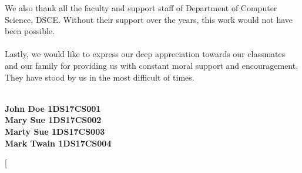 \documentclass[ 12pt,a4paper,twocolumn,fleqn]{article}
\begin{document}
We also thank all the faculty and support staff of Department of Computer Science, DSCE. Without their support over the years, this work would not have been possible.
\\
\hfill
\\
Lastly, we would like to express our deep appreciation towards our classmates and our family for providing us with constant moral support and encouragement. They have stood by us in the most difficult of times.
\\
\hfill
\\
\begin{flushright}
\textbf{John Doe \space 1DS17CS001} \\
\textbf{Mary Sue \space 1DS17CS002} \\
\textbf{Marty Sue \space 1DS17CS003} \\
\textbf{Mark Twain \space 1DS17CS004} \\
\end{flushright}
\newpage
  \pagestyle{fancy}
\thisfancypage{%
  \setlength{\fboxsep}{20pt}\doublebox}{}
\twocolumn[
\end{document}
